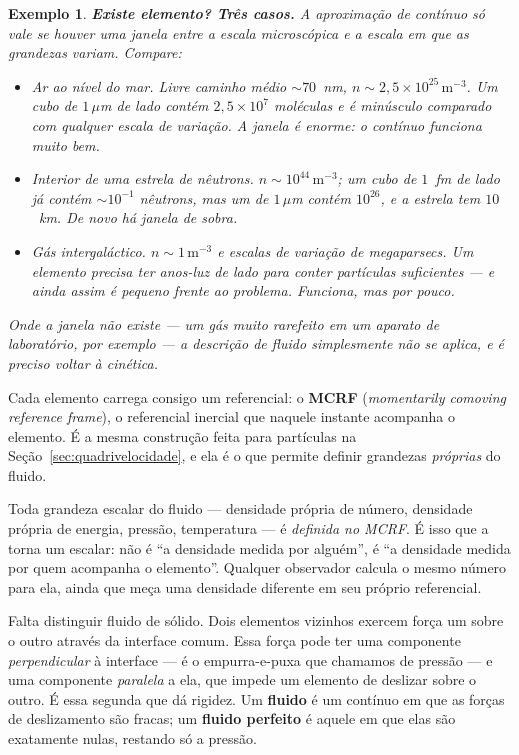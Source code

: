 \documentclass[12pt,a4paper,oneside]{book}
\theoremstyle{rgplain}
\newtheorem{example}{Exemplo}[chapter]
\theoremstyle{rgremark}
\begin{document}
\begin{example}
\textbf{Existe elemento? Três casos.} A aproximação de contínuo só vale se
houver uma janela entre a escala microscópica e a escala em que as grandezas
variam. Compare:

\begin{itemize}
  \item \emph{Ar ao nível do mar.} Livre caminho médio $\sim70$~nm,
  $n\sim2{,}5\times10^{25}\,\mathrm{m^{-3}}$. Um cubo de $1\,\mu$m de lado
  contém $2{,}5\times10^{7}$ moléculas e é minúsculo comparado com qualquer
  escala de variação. A janela é enorme: o contínuo funciona muito bem.

  \item \emph{Interior de uma estrela de nêutrons.} $n\sim10^{44}\,
  \mathrm{m^{-3}}$; um cubo de $1$~fm de lado já contém $\sim10^{-1}$
  nêutrons, mas um de $1\,\mu$m contém $10^{26}$, e a estrela tem $10$~km.
  De novo há janela de sobra.

  \item \emph{Gás intergaláctico.} $n\sim1\,\mathrm{m^{-3}}$ e escalas de
  variação de megaparsecs. Um elemento precisa ter anos-luz de lado para
  conter partículas suficientes --- e ainda assim é pequeno frente ao
  problema. Funciona, mas por pouco.
\end{itemize}
Onde a janela não existe --- um gás muito rarefeito em um aparato de
laboratório, por exemplo --- a descrição de fluido simplesmente não se
aplica, e é preciso voltar à cinética.
\end{example}

Cada elemento carrega consigo um referencial: o \textbf{MCRF}
(\emph{momentarily comoving reference frame}), o referencial inercial que
naquele instante acompanha o elemento. É a mesma construção feita para
partículas na Seção~\ref{sec:quadrivelocidade}, e ela é o que permite definir
grandezas \emph{próprias} do fluido.

\begin{central}
Toda grandeza escalar do fluido --- densidade própria de número, densidade
própria de energia, pressão, temperatura --- é \emph{definida no MCRF}. É
isso que a torna um escalar: não é ``a densidade medida por alguém'', é ``a
densidade medida por quem acompanha o elemento''. Qualquer observador calcula
o mesmo número para ela, ainda que meça uma densidade diferente em seu
próprio referencial.
\end{central}

Falta distinguir fluido de sólido. Dois elementos vizinhos exercem força um
sobre o outro através da interface comum. Essa força pode ter uma componente
\emph{perpendicular} à interface --- é o empurra-e-puxa que chamamos de
pressão --- e uma componente \emph{paralela} a ela, que impede um elemento de
deslizar sobre o outro. É essa segunda que dá rigidez. Um \textbf{fluido} é
um contínuo em que as forças de deslizamento são fracas; um \textbf{fluido
perfeito} é aquele em que elas são exatamente nulas, restando só a pressão.
\end{document}
